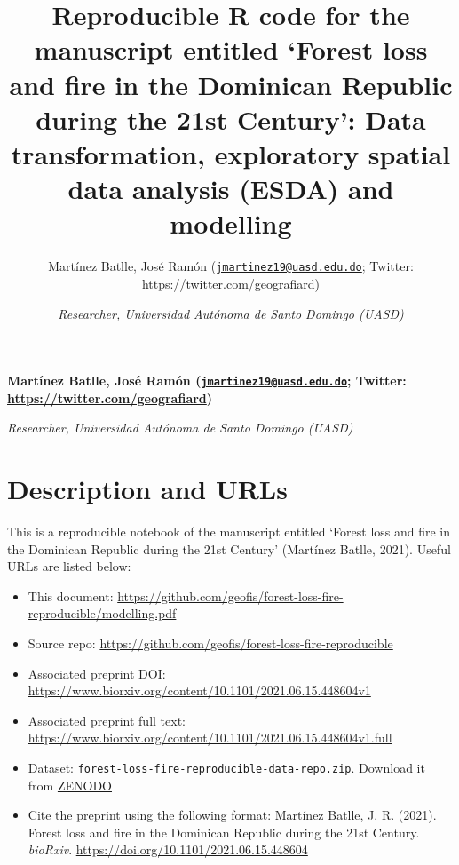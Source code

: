 \documentclass[10pt,landscape,a3paper]{article}
\title{Reproducible R code for the manuscript entitled `Forest loss and
fire in the Dominican Republic during the 21st Century': Data
transformation, exploratory spatial data analysis (ESDA) and
modelling  }
\author{\Large Martínez Batlle, José Ramón
(\href{mailto:jmartinez19@uasd.edu.do}{\nolinkurl{jmartinez19@uasd.edu.do}};
Twitter:
\url{https://twitter.com/geografiard})\vspace{0.05in} \newline\normalsize\emph{}   \and \Large \vspace{0.05in} \newline\normalsize\emph{Researcher,
Universidad Autónoma de Santo Domingo (UASD)}  }
\date{}
\newcommand*{\authorfont}{\fontfamily{phv}\selectfont}
\begin{document}
	
%    


{%
\setlength{\parindent}{0pt}
\thispagestyle{plain}
{\fontsize{18}{20}\selectfont\raggedright 
\maketitle  %

}

{
   \vskip 13.5pt\relax \normalsize\fontsize{11}{12} 
\textbf{\authorfont Martínez Batlle, José Ramón
(\href{mailto:jmartinez19@uasd.edu.do}{\nolinkurl{jmartinez19@uasd.edu.do}};
Twitter:
\url{https://twitter.com/geografiard})} \hskip 15pt \emph{\small }   \par \textbf{\authorfont } \hskip 15pt \emph{\small Researcher,
Universidad Autónoma de Santo Domingo (UASD)}   

}

}






\vskip 6.5pt

{
\hypersetup{linkcolor=black}
\setcounter{tocdepth}{4}
\tableofcontents
}

\noindent  \hypertarget{description-and-urls}{%
\section{Description and URLs}\label{description-and-urls}}

This is a reproducible notebook of the manuscript entitled `Forest loss
and fire in the Dominican Republic during the 21st Century' (Martínez
Batlle, 2021). Useful URLs are listed below:

\begin{itemize}
\item
  This document:
  \url{https://github.com/geofis/forest-loss-fire-reproducible/modelling.pdf}
\item
  Source repo:
  \url{https://github.com/geofis/forest-loss-fire-reproducible}
\item
  Associated preprint DOI:
  \url{https://www.biorxiv.org/content/10.1101/2021.06.15.448604v1}
\item
  Associated preprint full text:
  \url{https://www.biorxiv.org/content/10.1101/2021.06.15.448604v1.full}
\item
  Dataset: \texttt{forest-loss-fire-reproducible-data-repo.zip}.
  Download it from \href{https://doi.org/10.5281/zenodo.5682103}{ZENODO}
\item
  Cite the preprint using the following format: Martínez Batlle, J. R.
  (2021). Forest loss and fire in the Dominican Republic during the 21st
  Century. \emph{bioRxiv}.
  \url{https://doi.org/10.1101/2021.06.15.448604}
\end{itemize}
\end{document}
